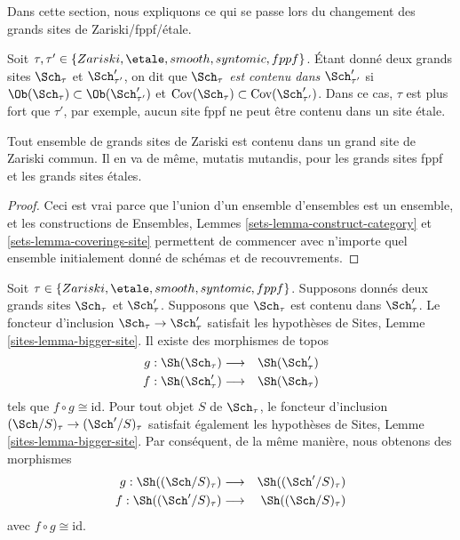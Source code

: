 \noindent
Dans cette section, nous expliquons ce qui se passe lors du changement des grands sites de Zariski/fppf/étale.

\medskip\noindent
Soit $\tau, \tau' \in \{Zariski, \etale, smooth, syntomic, fppf\}$. Étant donné deux grands sites $\Sch_\tau$ et $\Sch'_{\tau'}$, on dit que {\it $\Sch_\tau$ est contenu dans $\Sch'_{\tau'}$} si $\Ob(\Sch_\tau) \subset \Ob(\Sch'_{\tau'})$ et $\text{Cov}(\Sch_\tau) \subset \text{Cov}(\Sch'_{\tau'})$. Dans ce cas, $\tau$ est plus fort que $\tau'$, par exemple, aucun site fppf ne peut être contenu dans un site étale.

\begin{lemma}
\label{lemma-contained-in}
Tout ensemble de grands sites de Zariski est contenu dans un grand site de Zariski commun. Il en va de même, mutatis mutandis, pour les grands sites fppf et les grands sites étales.
\end{lemma}

\begin{proof}
Ceci est vrai parce que l'union d'un ensemble d'ensembles est un ensemble, et les constructions de Ensembles, Lemmes \ref{sets-lemma-construct-category} et \ref{sets-lemma-coverings-site} permettent de commencer avec n'importe quel ensemble initialement donné de schémas et de recouvrements.
\end{proof}

\begin{lemma}
\label{lemma-change-alpha}
Soit $\tau \in \{Zariski, \etale, smooth, syntomic, fppf\}$. Supposons donnés deux grands sites $\Sch_\tau$ et $\Sch'_\tau$. Supposons que $\Sch_\tau$ est contenu dans $\Sch'_\tau$. Le foncteur d'inclusion $\Sch_\tau \to \Sch'_\tau$ satisfait les hypothèses de Sites, Lemme \ref{sites-lemma-bigger-site}. Il existe des morphismes de topos
\begin{eqnarray*}
g : \Sh(\Sch_\tau) &
\longrightarrow &
\Sh(\Sch'_\tau) \\
f : \Sh(\Sch'_\tau) &
\longrightarrow &
\Sh(\Sch_\tau)
\end{eqnarray*}
tels que $f \circ g \cong \text{id}$. Pour tout objet $S$ de $\Sch_\tau$, le foncteur d'inclusion $(\Sch/S)_\tau \to (\Sch'/S)_\tau$ satisfait également les hypothèses de Sites, Lemme \ref{sites-lemma-bigger-site}. Par conséquent, de la même manière, nous obtenons des morphismes
\begin{eqnarray*}
g : \Sh((\Sch/S)_\tau) &
\longrightarrow &
\Sh((\Sch'/S)_\tau) \\
f : \Sh((\Sch'/S)_\tau) &
\longrightarrow &
\Sh((\Sch/S)_\tau)
\end{eqnarray*}
avec $f \circ g \cong \text{id}$.
\end{lemma}

